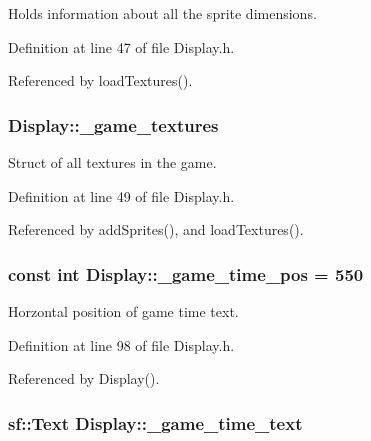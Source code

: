 Holds information about all the sprite dimensions. 



Definition at line 47 of file Display.\-h.



Referenced by load\-Textures().

\hypertarget{classDisplay_a64ae525710346f1a982efa05b8c53a88}{
\subsubsection[{\-\_\-game\-\_\-textures}]{ Display\-::\-\_\-game\-\_\-textures\hspace{0.3cm}{\ttfamily [private]}}}\label{classDisplay_a64ae525710346f1a982efa05b8c53a88}


Struct of all textures in the game. 



Definition at line 49 of file Display.\-h.



Referenced by add\-Sprites(), and load\-Textures().

\hypertarget{classDisplay_ad9b50fa7903081469111841965b995ba}{
\subsubsection[{\-\_\-game\-\_\-time\-\_\-pos}]{\setlength{\rightskip}{0pt plus 5cm}const int Display\-::\-\_\-game\-\_\-time\-\_\-pos = 550\hspace{0.3cm}{\ttfamily [private]}}}\label{classDisplay_ad9b50fa7903081469111841965b995ba}


Horzontal position of game time text. 



Definition at line 98 of file Display.\-h.



Referenced by Display().

\hypertarget{classDisplay_a36007f3ed0cb7f8174ef601dbde3adab}{
\subsubsection[{\-\_\-game\-\_\-time\-\_\-text}]{\setlength{\rightskip}{0pt plus 5cm}sf\-::\-Text Display\-::\-\_\-game\-\_\-time\-\_\-text\hspace{0.3cm}{\ttfamily [private]}}}\label{classDisplay_a36007f3ed0cb7f8174ef601dbde3adab}


